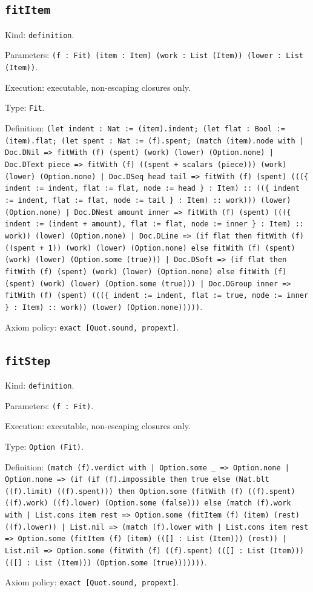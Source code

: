\documentclass[11pt]{article}
\begin{document}
\subsection*{\texttt{fitItem}}
\noindent Kind: \texttt{definition}.\par
\noindent Parameters: \texttt{(f : Fit) (item : Item) (work : List (Item)) (lower : List (Item))}.\par
\noindent Execution: executable, non-escaping closures only.\par
\noindent Type: \texttt{Fit}.\par
\noindent Definition: \texttt{(let indent : Nat := (item).indent; (let flat : Bool := (item).flat; (let spent : Nat := (f).spent; (match (item).node with | Doc.DNil => fitWith (f) (spent) (work) (lower) (Option.none) | Doc.DText piece => fitWith (f) ((spent + scalars (piece))) (work) (lower) (Option.none) | Doc.DSeq head tail => fitWith (f) (spent) (((\{ indent := indent, flat := flat, node := head \} : Item) :: ((\{ indent := indent, flat := flat, node := tail \} : Item) :: work))) (lower) (Option.none) | Doc.DNest amount inner => fitWith (f) (spent) (((\{ indent := (indent + amount), flat := flat, node := inner \} : Item) :: work)) (lower) (Option.none) | Doc.DLine => (if flat then fitWith (f) ((spent + 1)) (work) (lower) (Option.none) else fitWith (f) (spent) (work) (lower) (Option.some (true))) | Doc.DSoft => (if flat then fitWith (f) (spent) (work) (lower) (Option.none) else fitWith (f) (spent) (work) (lower) (Option.some (true))) | Doc.DGroup inner => fitWith (f) (spent) (((\{ indent := indent, flat := true, node := inner \} : Item) :: work)) (lower) (Option.none)))))}.\par
\noindent Axiom policy: \texttt{exact [Quot.sound, propext]}.\par
\subsection*{\texttt{fitStep}}
\noindent Kind: \texttt{definition}.\par
\noindent Parameters: \texttt{(f : Fit)}.\par
\noindent Execution: executable, non-escaping closures only.\par
\noindent Type: \texttt{Option (Fit)}.\par
\noindent Definition: \texttt{(match (f).verdict with | Option.some \_ => Option.none | Option.none => (if (if (f).impossible then true else (Nat.blt ((f).limit) ((f).spent))) then Option.some (fitWith (f) ((f).spent) ((f).work) ((f).lower) (Option.some (false))) else (match (f).work with | List.cons item rest => Option.some (fitItem (f) (item) (rest) ((f).lower)) | List.nil => (match (f).lower with | List.cons item rest => Option.some (fitItem (f) (item) (([] : List (Item))) (rest)) | List.nil => Option.some (fitWith (f) ((f).spent) (([] : List (Item))) (([] : List (Item))) (Option.some (true)))))))}.\par
\noindent Axiom policy: \texttt{exact [Quot.sound, propext]}.\par
\end{document}
